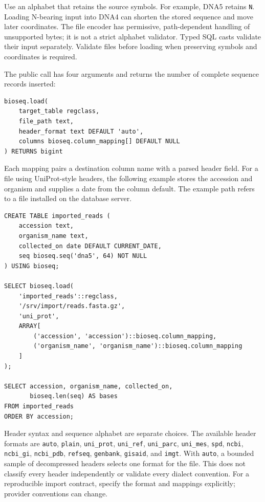 Use an alphabet that retains the source symbols. For example, DNA5 retains
\texttt{N}. Loading N-bearing input into DNA4 can shorten the stored sequence
and move later coordinates. The file encoder has permissive, path-dependent
handling of unsupported bytes; it is not a strict alphabet validator.
Typed SQL casts validate their input separately. Validate files before
loading when preserving symbols and coordinates is required.

The public call has four arguments and returns the number of complete
sequence records inserted:
\par\noindent\begin{minipage}{\linewidth}
\begin{lstlisting}[style=bioseq-appendix-sql]
bioseq.load(
    target_table regclass,
    file_path text,
    header_format text DEFAULT 'auto',
    columns bioseq.column_mapping[] DEFAULT NULL
) RETURNS bigint
\end{lstlisting}
\end{minipage}

Each mapping pairs a destination column name with a parsed header field.
For a file using UniProt-style headers, the following example stores the
accession and organism and supplies a date from the column default. The
example path refers to a file installed on the database server.
\par\noindent\begin{minipage}{\linewidth}
\begin{lstlisting}[style=bioseq-appendix-sql]
CREATE TABLE imported_reads (
    accession text,
    organism_name text,
    collected_on date DEFAULT CURRENT_DATE,
    seq bioseq.seq('dna5', 64) NOT NULL
) USING bioseq;

SELECT bioseq.load(
    'imported_reads'::regclass,
    '/srv/import/reads.fasta.gz',
    'uni_prot',
    ARRAY[
        ('accession', 'accession')::bioseq.column_mapping,
        ('organism_name', 'organism_name')::bioseq.column_mapping
    ]
);

SELECT accession, organism_name, collected_on,
       bioseq.len(seq) AS bases
FROM imported_reads
ORDER BY accession;
\end{lstlisting}
\end{minipage}

Header syntax and sequence alphabet are separate choices. The available
header formats are \texttt{auto}, \texttt{plain}, \texttt{uni\_prot},
\texttt{uni\_ref}, \texttt{uni\_parc}, \texttt{uni\_mes}, \texttt{spd},
\texttt{ncbi}, \texttt{ncbi\_gi}, \texttt{ncbi\_pdb}, \texttt{refseq},
\texttt{genbank}, \texttt{gisaid}, and \texttt{imgt}.
With \texttt{auto}, a bounded sample of decompressed headers selects one
format for the file. This does not classify every header independently or
validate every dialect convention. For a reproducible import contract,
specify the format and mappings explicitly; provider conventions can change.

